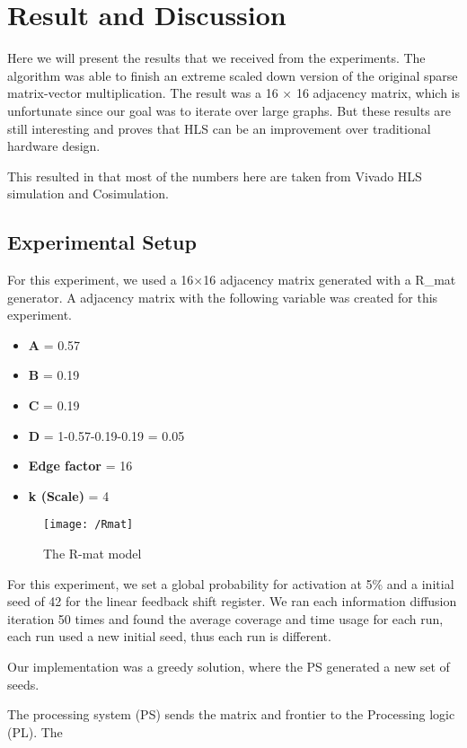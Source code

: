 \chapter{Result and Discussion} \label{result}
Here we will present the results that we received from the experiments. The algorithm was able to finish an extreme scaled down version of the original sparse matrix-vector multiplication. The result was a 16 $\times$ 16 adjacency matrix, which is unfortunate since our goal was to iterate over large graphs. But these results are still interesting and proves that HLS can be an improvement over traditional hardware design.


This resulted in that most of the numbers here are taken from Vivado HLS simulation and Cosimulation. 

\section{Experimental Setup}
For this experiment, we used a 16$\times$16 adjacency matrix generated with a R\_mat generator. A adjacency matrix with the following variable was created for this experiment.
\begin{itemize}
\item \textbf{A} = 0.57
\item \textbf{B} = 0.19
\item \textbf{C} = 0.19
\item \textbf{D} = 1-0.57-0.19-0.19 = 0.05
\item \textbf{Edge factor}  = 16
\item \textbf{k (Scale)} = 4
\end{itemize}

\begin{figure}
\texttt{[image: /Rmat]}
\caption{The R-mat model \cite{Rmat2004}}
\label{fig:Rmat}
\end{figure}

For this experiment, we set a global probability for activation at 5\% and a initial seed of 42 for the linear feedback shift register. We ran each information diffusion iteration 50 times and found the average coverage and time usage for each run, each run used a new initial seed, thus each run is different. 

Our implementation was a greedy solution, where the PS generated a new set of seeds. 

The processing system (PS) sends the matrix and frontier to the Processing logic (PL). The	

